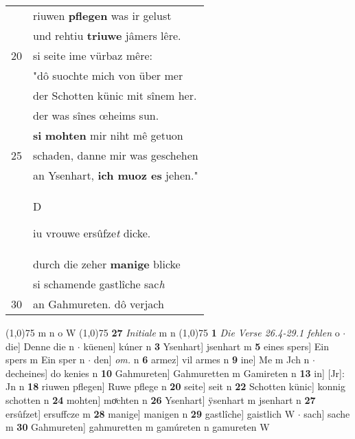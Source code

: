 \documentclass[8pt,a4paper,notitlepage]{article}
\begin{document}
\begin{table}[ht]
\begin{minipage}[t]{0.5\linewidth}
\begin{tabular}{rl}
 & riuwen \textbf{pflegen} was ir gelust\\ 
 & und rehtiu \textbf{triuwe} jâmers lêre.\\ 
20 & si seite ime vürbaz mêre:\\ 
 & "dô suochte mich von über mer\\ 
 & der Schotten künic mit sînem her.\\ 
 & der was sînes œheims sun.\\ 
 & \textbf{si} \textbf{mohten} mir niht mê getuon\\ 
25 & schaden, danne mir was geschehen\\ 
 & an Ysenhart, \textbf{ich muoz es} jehen."\\ 
 & \begin{large}D\end{large}iu vrouwe ersûfze\textit{t}  dicke.\\ 
 & durch die zeher \textbf{manige} blicke\\ 
 & si schamende gastlîche sac\textit{h}\\ 
30 & an Gahmureten. dô verjach\\ 
\end{tabular}
\scriptsize
\line(1,0){75} \newline
m n o W \newline
\line(1,0){75} \newline
\textbf{27} \textit{Initiale} m n  \newline
\line(1,0){75} \newline
\textbf{1} \textit{Die Verse 26.4-29.1 fehlen} o   $\cdot$ die] Denne die n  $\cdot$ küenen] kúner n \textbf{3} Ysenhart] jsenhart m \textbf{5} eines spers] Ein spers m Ein sper n  $\cdot$ den] \textit{om.} n \textbf{6} armez] vil armes n \textbf{9} ine] Me m Jch n  $\cdot$ decheines] do kenies n \textbf{10} Gahmureten] Gahmuretten m Gamireten n \textbf{13} in] [Jr]: Jn n \textbf{18} riuwen pflegen] Ruwe pflege n \textbf{20} seite] seit n \textbf{22} Schotten künic] konnig schotten n \textbf{24} mohten] moͯchten n \textbf{26} Ysenhart] ÿsenhart m jsenhart n \textbf{27} ersûfzet] ersuffcze m \textbf{28} manige] manigen n \textbf{29} gastlîche] gaistlich W  $\cdot$ sach] sache m \textbf{30} Gahmureten] gahmuretten m gamúreten n gamureten W \newline
\end{minipage}
\end{table}
\newpage
\end{document}
